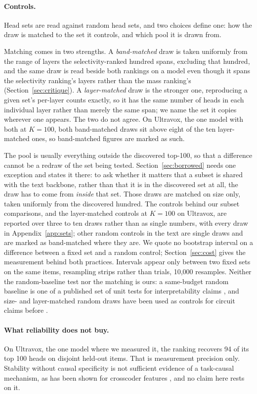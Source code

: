 \documentclass[11pt]{article}
\begin{document}
\paragraph{Controls.} Head sets are read against random head sets, and two
choices define one: how the draw is matched to the set it controls, and which
pool it is drawn from.

Matching comes in two strengths. A \emph{band-matched} draw is taken uniformly
from the range of layers the selectivity-ranked hundred spans, excluding that
hundred, and the same draw is read beside both rankings on a model even though it
spans the selectivity ranking's layers rather than the mass ranking's
(Section~\ref{sec:critique}). A \emph{layer-matched} draw is the stronger one,
reproducing a given set's per-layer counts exactly, so it has the same number of
heads in each individual layer rather than merely the same span; we name the set
it copies wherever one appears. The two do not agree. On Ultravox, the one model
with both at $K{=}100$, both band-matched draws sit above eight of the ten
layer-matched ones, so band-matched figures are marked as such.

The pool is usually everything outside the discovered top-100, so that a
difference cannot be a redraw of the set being tested. Section~\ref{sec:borrowed}
needs one exception and states it there: to ask whether it matters that a subset
is shared with the text backbone, rather than that it is in the discovered set at
all, the draw has to come from \emph{inside} that set. Those draws are matched on
size only, taken uniformly from the discovered hundred. The controls behind our
subset comparisons, and the layer-matched controls at $K{=}100$ on Ultravox, are
reported over three to ten draws rather than as single numbers, with every draw
in Appendix~\ref{app:sets}; other random controls in the text are single draws
and are marked as band-matched where they are. We quote no bootstrap interval on
a difference
between a fixed set and a random control; Section~\ref{sec:cost} gives the
measurement behind both practices. Intervals appear only between two fixed
sets on the same items, resampling strips rather than trials, 10{,}000 resamples.
Neither the random-baseline test nor the matching is ours: a same-budget random
baseline is one of a published set of unit tests for interpretability claims
\citep{unittests2026}, and size- and layer-matched random draws have been used as
controls for circuit claims before \citep{shengfu2026matched}.

\paragraph{What reliability does not buy.} On Ultravox, the one model where we
measured it, the ranking recovers 94 of its top 100 heads on disjoint held-out
items. That is measurement precision only. Stability
without causal specificity is not sufficient evidence of a task-causal
mechanism, as has been shown for crosscoder features \citep{seedstability2026}, and no claim here rests on it.
\end{document}

